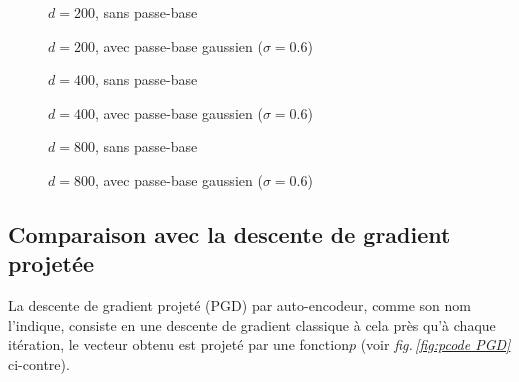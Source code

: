 \documentclass[hidelinks, french]{article} %
\newcommand{\figref}[1]{\textit{fig.\,\ref{#1}}}
\theoremstyle{enonce}
\theoremstyle{special}
\theoremstyle{rq}
\theoremstyle{exo}
\theoremstyle{demo}
\begin{document}
\begin{figure}[H]\centering
	
	\caption{$d=200$, sans passe-base}
	\label{fig:LGDlat200-s}
\end{figure}

\begin{figure}[H]\centering
	
	\caption{$d=200$, avec passe-base gaussien ($\sigma=0.6$)}
	\label{fig:LGDlat200-g}
\end{figure}

\begin{figure}[H]\centering
	
	\caption{$d=400$, sans passe-base}
	\label{fig:LGDlat400-s}
\end{figure}

\begin{figure}[H]\centering
	
	\caption{$d=400$, avec passe-base gaussien ($\sigma=0.6$)}
	\label{fig:LGDlat400-g}
\end{figure}

\begin{figure}[H]\centering
	
	\caption{$d=800$, sans passe-base}
	\label{fig:LGDlat800-s}
\end{figure}

\begin{figure}[H]\centering
	
	\caption{$d=800$, avec passe-base gaussien ($\sigma=0.6$)}
	\label{fig:LGDlat800-g}
\end{figure}





\newpage



\subsection{Comparaison avec la descente de gradient projetée}\label{sec:PGD}
\quad

La descente de gradient projeté (PGD) par auto-encodeur, comme son nom l'indique, consiste en une descente de gradient classique à cela près qu'à chaque itération, le vecteur obtenu est projeté par une fonction$p$ (voir \figref{fig:pcode PGD} ci-contre).
\end{document}
